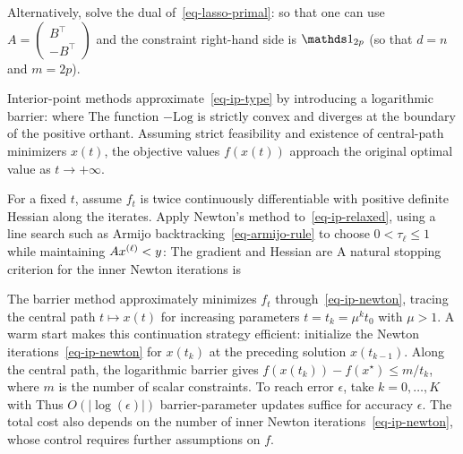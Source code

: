 \begin{exmp}
	Alternatively, solve the dual of~\eqref{eq-lasso-primal}:
	so that one can use $A=\begin{pmatrix} B^\top \\-B^\top \end{pmatrix}$ and the constraint right-hand side is $\ones_{2p}$ (so that $d=n$ and $m=2p$).
\end{exmp}

Interior-point methods approximate~\eqref{eq-ip-type} by introducing a logarithmic barrier:
where 
The function $-\mathrm{Log}$ is strictly convex and diverges at the boundary of the positive orthant.
%
Assuming strict feasibility and existence of central-path minimizers $x(t)$, the objective values $f(x(t))$ approach the original optimal value as $t\to+\infty$.

For a fixed $t$, assume $f_t$ is twice continuously differentiable with positive definite Hessian along the iterates. Apply Newton's method to~\eqref{eq-ip-relaxed}, using a line search such as Armijo backtracking~\eqref{eq-armijo-rule} to choose $0<\tau_\ell\leq1$ while maintaining $A\it{x}<y$:
The gradient and Hessian are
A natural stopping criterion for the inner Newton iterations is


The barrier method approximately minimizes $f_t$ through~\eqref{eq-ip-newton}, tracing the central path $t \mapsto x(t)$ for increasing parameters $t=t_k=\mu^k t_0$ with $\mu > 1$.
%
A warm start makes this continuation strategy efficient: initialize the Newton iterations~\eqref{eq-ip-newton} for $x(t_k)$ at the preceding solution $x(t_{k-1})$.
%
Along the central path, the logarithmic barrier gives $f(x(t_k))-f(x^\star) \leq m/t_k$, where $m$ is the number of scalar constraints. To reach error $\epsilon$, take $k=0, \ldots, K$ with
Thus $O(|\log(\epsilon)|)$ barrier-parameter updates suffice for accuracy $\epsilon$. The total cost also depends on the number of inner Newton iterations~\eqref{eq-ip-newton}, whose control requires further assumptions on $f$.


